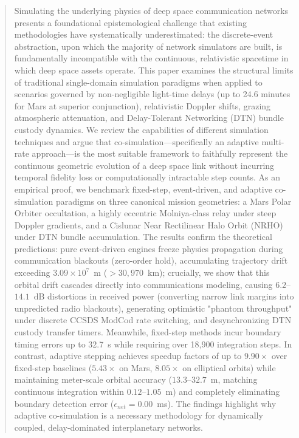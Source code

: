 \documentclass[a4paper,fleqn]{cas-sc}
\begin{document}
\begin{abstract}
Simulating the underlying physics of deep space communication networks presents a foundational epistemological challenge that existing methodologies have systematically underestimated: the discrete-event abstraction, upon which the majority of network simulators are built, is fundamentally incompatible with the continuous, relativistic spacetime in which deep space assets operate. This paper examines the structural limits of traditional single-domain simulation paradigms when applied to scenarios governed by non-negligible light-time delays (up to 24.6 minutes for Mars at superior conjunction), relativistic Doppler shifts, grazing atmospheric attenuation, and Delay-Tolerant Networking (DTN) bundle custody dynamics. We review the capabilities of different simulation techniques and argue that co-simulation---specifically an adaptive multi-rate approach---is the most suitable framework to faithfully represent the continuous geometric evolution of a deep space link without incurring temporal fidelity loss or computationally intractable step counts. As an empirical proof, we benchmark fixed-step, event-driven, and adaptive co-simulation paradigms on three canonical mission geometries: a Mars Polar Orbiter occultation, a highly eccentric Molniya-class relay under steep Doppler gradients, and a Cislunar Near Rectilinear Halo Orbit (NRHO) under DTN bundle accumulation. {\color{revcolor}The results confirm the theoretical predictions: pure event-driven engines freeze physics propagation during communication blackouts (zero-order hold), accumulating trajectory drift exceeding $3.09 \times 10^7$~m ($>30,970$~km); crucially, we show that this orbital drift cascades directly into communications modeling, causing $6.2$--$14.1$~dB distortions in received power (converting narrow link margins into unpredicted radio blackouts), generating optimistic "phantom throughput" under discrete CCSDS ModCod rate switching, and desynchronizing DTN custody transfer timers. Meanwhile, fixed-step methods incur boundary timing errors up to 32.7~s while requiring over 18,900 integration steps. In contrast, adaptive stepping achieves speedup factors of up to $9.90\times$ over fixed-step baselines ($5.43\times$ on Mars, $8.05\times$ on elliptical orbits) while maintaining meter-scale orbital accuracy ($13.3$--$32.7$~m, matching continuous integration within $0.12$--$1.05$~m) and completely eliminating boundary detection error ($\epsilon_{net} = 0.00$~ms).} The findings highlight why adaptive co-simulation is a necessary methodology for dynamically coupled, delay-dominated interplanetary networks.
\end{abstract}
\end{document}
